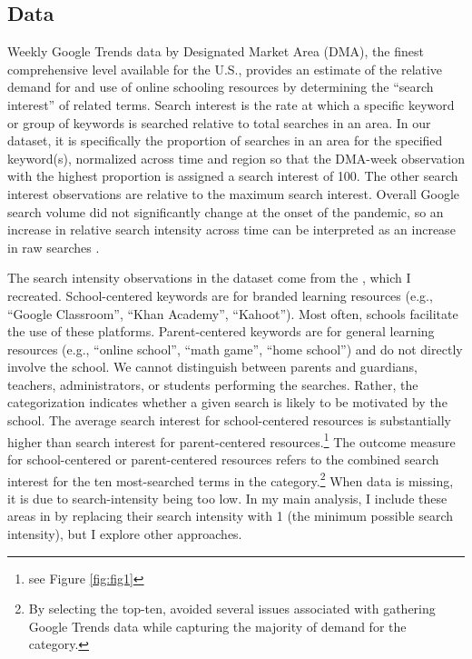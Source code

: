 \subsection{Data}
Weekly Google Trends data by Designated Market Area (DMA), the finest comprehensive level available for the U.S., provides an estimate of the relative demand for and use of online schooling resources by determining the “search interest” of related terms.
Search interest is the rate at which a specific keyword or group of keywords is searched relative to total searches in an area.
In our dataset, it is specifically the proportion of searches in an area for the specified keyword(s), normalized across time and region so that the DMA-week observation with the highest proportion is assigned a search interest of 100.
The other search interest observations are relative to the maximum search interest.
Overall Google search volume did not significantly change at the onset of the pandemic, so an increase in relative search intensity across time can be interpreted as an increase in raw searches \citep{bh1}.
\par
The search intensity observations in the dataset come from the \cite{bh1}, which I recreated.
School-centered keywords are for branded learning resources (e.g., “Google Classroom”, “Khan Academy”, “Kahoot”).
Most often, schools facilitate the use of these platforms.
Parent-centered keywords are for general learning resources (e.g., “online school”, “math game”, “home school”) and do not directly involve the school.
We cannot distinguish between parents and guardians, teachers, administrators, or students performing the searches.
Rather, the categorization indicates whether a given search is likely to be motivated by the school.
The average search interest for school-centered resources is substantially higher than search interest for parent-centered resources.\footnote{see Figure \ref{fig:fig1}} The outcome measure for school-centered or parent-centered resources refers to the combined search interest for the ten most-searched terms in the category.\footnote{By selecting the top-ten, \cite{bh1} avoided several issues associated with gathering Google Trends data while capturing the majority of demand for the category.} When data is missing, it is due to search-intensity being too low.
In my main analysis, I include these areas in by replacing their search intensity with 1 (the minimum possible search intensity), but I explore other approaches.
\par


